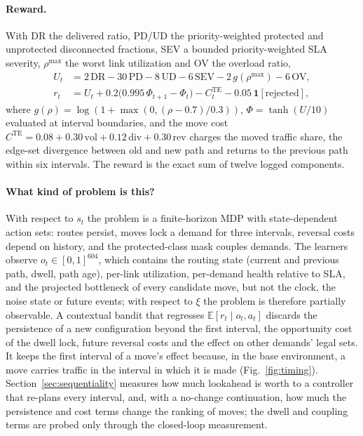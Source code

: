 \paragraph{Reward.}
With $\mathrm{DR}$ the delivered ratio, PD/UD the priority-weighted protected
and unprotected disconnected fractions, SEV a bounded priority-weighted SLA
severity, $\rho^{\max}$ the worst link utilization and OV the overload ratio,
\begin{equation}
\begin{split}
U_t&=2\,\mathrm{DR}-30\,\mathrm{PD}-8\,\mathrm{UD}-6\,\mathrm{SEV}-2\,g(\rho^{\max})-6\,\mathrm{OV},\\
r_t&=U_t+0.2\big(0.995\,\Phi_{t+1}-\Phi_t\big)-C^{\mathrm{TE}}_t-0.05\,\mathbf{1}[\text{rejected}],
\end{split}
\label{eq:reward}
\end{equation}
where $g(\rho)=\log(1+\max(0,(\rho-0.7)/0.3))$, $\Phi=\tanh(U/10)$ evaluated at
interval boundaries, and the move cost
$C^{\mathrm{TE}}=0.08+0.30\,\mathrm{vol}+0.12\,\mathrm{div}+0.30\,\mathrm{rev}$
charges the moved traffic share, the edge-set divergence between old and new
path and returns to the previous path within six intervals. The reward is the
exact sum of twelve logged components.

\paragraph{What kind of problem is this?}
With respect to $s_t$ the problem is a finite-horizon MDP with state-dependent
action sets: routes persist, moves lock a demand for three intervals, reversal
costs depend on history, and the protected-class mask couples demands. The
learners observe $o_t\in[0,1]^{604}$, which contains the routing state (current
and previous path, dwell, path age), per-link utilization, per-demand health
relative to SLA, and the projected bottleneck of every candidate move, but not
the clock, the noise state or future events; with respect to $\xi$ the problem
is therefore partially observable. A contextual bandit that regresses
$\mathbb E[r_t\mid o_t,a_t]$ discards the persistence of a new configuration
beyond the first interval, the opportunity cost of the dwell lock, future
reversal costs and the effect on other demands' legal sets. It keeps the first
interval of a move's effect because, in the base environment, a move carries
traffic in the interval in which it is made (Fig.~\ref{fig:timing}).
Section~\ref{sec:sequentiality} measures how much lookahead is worth to a
controller that re-plans every interval, and, with a no-change continuation,
how much the persistence and cost terms change the ranking of moves; the dwell
and coupling terms are probed only through the closed-loop measurement.
